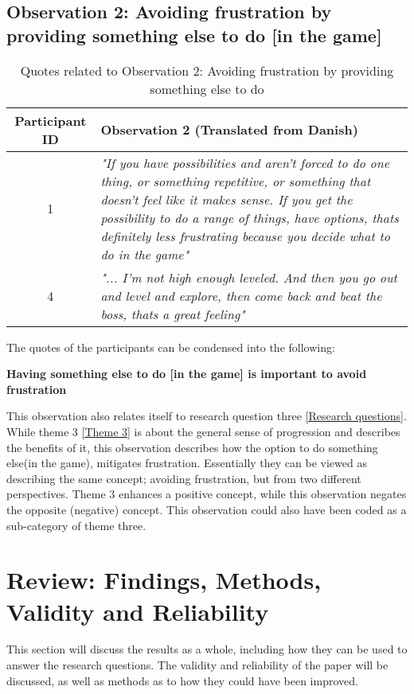 \subsection{Observation 2: Avoiding frustration by providing something else to do [in the game]}\label{Observation 2}
\begin{table}[H]

\centering
\begin{tabular}{@{}c p{11cm}@{}}
\toprule
\textbf{Participant ID} & \textbf{Observation 2} (Translated from Danish)\\
\midrule

1 & \textit{"If you have possibilities and aren't forced to do one thing, or something repetitive, or something that doesn't feel like it makes sense. If you get the possibility to do a range of things, have options, thats definitely less frustrating because you decide what to do in the game"}\\

\midrule

4& \textit{"... I'm not high enough leveled. And then you go out and level and explore, then come back and beat the boss, thats a great feeling"}\\
\bottomrule
\end{tabular}

\caption{Quotes related to Observation 2: Avoiding frustration by providing something else to do}
\label{tab:obs2-quotes}
\end{table}

The quotes of the participants can be condensed into the following:
\begin{center}
    \textbf{Having something else to do [in the game] is important to avoid frustration}
\end{center}

This observation also relates itself to research question three \ref{Research questions}. While theme 3 \ref{Theme 3} is about the general sense of progression and describes the benefits of it, this observation describes how the option to do something else(in the game), mitigates frustration. Essentially they can be viewed as describing the same concept; avoiding frustration, but from two different perspectives. Theme 3 enhances a positive concept, while this observation negates the opposite (negative) concept. This observation could also have been coded as a sub-category of theme three. 

\section{Review: Findings, Methods, Validity and Reliability}
This section will discuss the results as a whole, including how they can be used to answer the research questions. The validity and reliability of the paper will be discussed, as well as methods as to how they could have been improved. 

